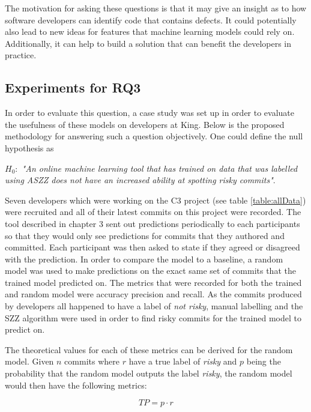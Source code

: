 \documentclass[../main.tex]{subfiles}
\begin{document}
The motivation for asking these questions is that it may give an insight as to how software developers can identify code that contains defects. It could potentially also lead to new ideas for features that machine learning models could rely on. Additionally, it can help to build a solution that can benefit the developers in practice. 

\subsection{Experiments for RQ3}

In order to evaluate this question, a case study was set up in order to evaluate the usefulness of these models on developers at King. Below is the proposed methodology for answering such a question objectively. One could define the null hypothesis as
\begin{center}
    \textit{$H_0:$ "An online machine learning tool that has trained on data that was labelled using ASZZ does not have an increased ability at spotting risky commits"}.
\end{center}

Seven developers which were working on the C3 project (see table \ref{table:allData}) were recruited and all of their latest commits on this project were recorded. The tool described in chapter 3 sent out predictions periodically to each participants so that they would only see predictions for commits that they authored and committed. Each participant was then asked to state if they agreed or disagreed with the prediction. In order to compare the model to a baseline, a random model was used to make predictions on the exact same set of commits that the trained model predicted on. The metrics that were recorded for both the trained and random model were accuracy precision and recall. As the commits produced by developers all happened to have a label of \textit{not risky}, manual labelling and the SZZ algorithm were used in order to find risky commits for the trained model to predict on. 

The theoretical values for each of these metrics can be derived for the random model. Given $n$ commits where $r$ have a true label of \textit{risky} and $p$ being the probability that the random model outputs the label \textit{risky}, the random model would then have the following metrics:

\begin{equation}
     TP = p \cdot r
\end{equation}
\end{document}
